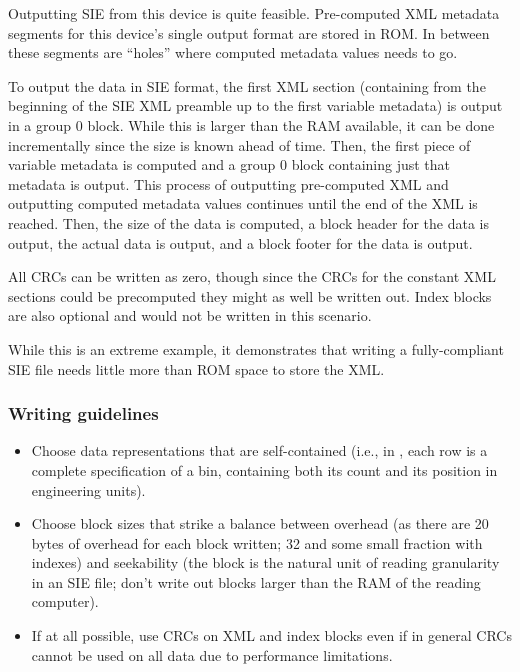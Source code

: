 \documentclass{article}
\begin{document}
Outputting SIE from this device is quite feasible.  Pre-computed XML
metadata segments for this device's single output format are stored in
ROM.  In between these segments are ``holes'' where computed metadata
values needs to go.

To output the data in SIE format, the first XML section (containing
from the beginning of the SIE XML preamble up to the first variable
metadata) is output in a group 0 block.  While this is larger than the
RAM available, it can be done incrementally since the size is known
ahead of time.  Then, the first piece of variable metadata is computed
and a group 0 block containing just that metadata is output.  This
process of outputting pre-computed XML and outputting computed
metadata values continues until the end of the XML is reached.  Then,
the size of the data is computed, a block header for the data is
output, the actual data is output, and a block footer for the data is
output.

All CRCs can be written as zero, though since the CRCs for the
constant XML sections could be precomputed they might as well be
written out.  Index blocks are also optional and would not be written
in this scenario.

While this is an extreme example, it demonstrates that writing a
fully-compliant SIE file needs little more than ROM space to store the
XML.

\subsubsection{Writing guidelines}


\begin{itemize}
\item Choose data representations that are self-contained (i.e., in
  , each row is a complete specification of a
  bin, containing both its count and its position in engineering
  units).
\item Choose block sizes that strike a balance between overhead (as
  there are 20 bytes of overhead for each block written; 32 and some
  small fraction with indexes) and seekability (the block is the
  natural unit of reading granularity in an SIE file; don't write out
  blocks larger than the RAM of the reading computer).
\item If at all possible, use CRCs on XML and index blocks even if in
  general CRCs cannot be used on all data due to performance
  limitations.
\end{itemize}
\end{document}

